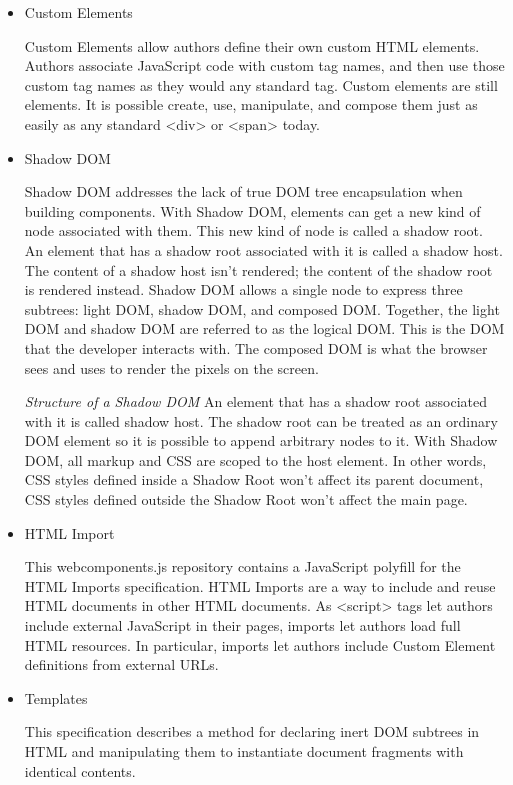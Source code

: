 \begin{itemize}

\item Custom Elements 

Custom Elements allow authors define their own custom HTML elements. Authors associate JavaScript code with custom tag names, and then use those custom tag names as they would any standard tag. Custom elements are still elements. It is possible create, use, manipulate, and compose them just as easily as any standard <div> or <span> today.\cite{tch_custom}

\item Shadow DOM

Shadow DOM addresses the lack of true DOM tree encapsulation when building components. With Shadow DOM, elements can get a new kind of node associated with them. This new kind of node is called a shadow root. An element that has a shadow root associated with it is called a shadow host. The content of a shadow host isn’t rendered; the content of the shadow root is rendered instead. Shadow DOM allows a single node to express three subtrees: light DOM, shadow DOM, and composed DOM. Together, the light DOM and shadow DOM are referred to as the logical DOM. This is the DOM that the developer interacts with. The composed DOM is what the browser sees and uses to render the pixels on the screen.\cite{tch_dom}

\emph{Structure of a Shadow DOM}
An element that has a shadow root associated with it is called shadow host. The shadow root can be treated as an ordinary DOM element so it is possible to append arbitrary nodes to it. With Shadow DOM, all markup and CSS are scoped to the host element. In other words, CSS styles defined inside a Shadow Root won't affect its parent document, CSS styles defined outside the Shadow Root won't affect the main page.

\item HTML Import 

This webcomponents.js repository contains a JavaScript polyfill for the HTML Imports specification.
HTML Imports are a way to include and reuse HTML documents in other HTML documents. As <script> tags let authors include external JavaScript in their pages, imports let authors load full HTML resources. In particular, imports let authors include Custom Element definitions from external URLs.

\item Templates

This specification describes a method for declaring inert DOM subtrees in HTML and manipulating them to instantiate document fragments with identical contents.
\end{itemize}

